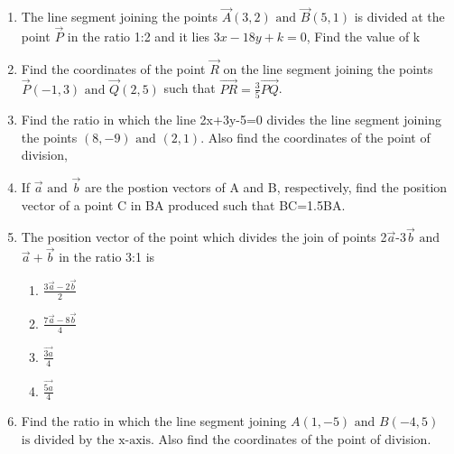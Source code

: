 \begin{enumerate}[label=\thesubsection.\arabic*,ref=\thesubsection.\theenumi]
\item The line segment joining the points $\vec{A}(3,2)\text{ and }\vec{B}(5,1)$ is divided at the point $\vec{P}$ in the ratio 1:2 and it lies $3x-18y+k=0$, Find the value of k  
\item Find the coordinates of the point $\vec{R}$ on the line segment joining the points $\vec{P}(-1,3)\text{ and }\vec{Q}(2,5)$ such that $\vec{PR}={\frac{3}{5}}\vec{PQ}$.
\item Find the ratio in which the line 2x+3y-5=0 divides the line segment joining the points $(8,-9)\text{ and }(2,1)$. Also find the coordinates of the point of division,
\item If $\vec{a}$ $\text{and}$ $\vec{b}$ are the postion vectors of A and B, respectively, find the position vector of a point C in BA produced such that BC=1.5BA.
\item The position vector of the point which divides the join of points 2$\vec{a}$-3$\vec{b}$ $\text{and}$ $\vec{a}+\vec{b}$ in the ratio 3:1 is
	\begin{enumerate}
\item $\frac{3\vec{a}-2\vec{b}}{2}$
\item $\frac{7\vec{a}-8\vec{b}}{4}$
\item $\frac{\vec{3a}}{4}$
\item $\frac{\vec{5a}}{4}$
\end{enumerate}
\item Find the ratio in which the line segment joining $A(1,-5) \text{ and } B(-4,5)$ $\text{is divided by the x-axis}$. Also find the coordinates of the point of division.
\end{enumerate}

